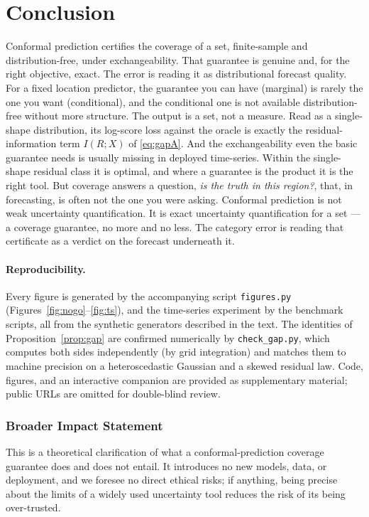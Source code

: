 \documentclass[10pt]{article} %
\theoremstyle{definition}
\begin{document}
\section{Conclusion}

Conformal prediction certifies the coverage of a set, finite-sample and
distribution-free, under exchangeability. That guarantee is genuine and, for the right
objective, exact. The error is reading it as distributional forecast quality. For a fixed
location predictor, the guarantee you can have (marginal) is rarely the one you want
(conditional), and the conditional one is not available distribution-free without more
structure. The output is a set, not a measure. Read as a single-shape distribution, its
log-score loss against the oracle is exactly the residual-information term
$I(R;X)$ of \eqref{eq:gapA}. And the exchangeability even the basic guarantee needs is
usually missing in deployed time-series. Within the single-shape residual class it is
optimal, and where a guarantee is the product it is the right tool. But coverage answers a question,
\emph{is the truth in this region?}, that, in forecasting, is often not the one you
were asking. Conformal prediction is not weak uncertainty quantification. It is exact
uncertainty quantification for a set --- a coverage guarantee, no more and no less. The
category error is reading that certificate as a verdict on the forecast underneath it.

\paragraph{Reproducibility.} Every figure is generated by the accompanying script
\texttt{figures.py} (Figures~\ref{fig:nogo}--\ref{fig:ts}), and the time-series experiment
by the benchmark scripts, all from the synthetic generators described in the text. The
identities of Proposition~\ref{prop:gap} are confirmed numerically by \texttt{check\_gap.py},
which computes both sides independently (by grid integration) and matches them to machine
precision on a heteroscedastic Gaussian and a skewed residual law. Code, figures, and an
interactive companion are provided as supplementary material; public URLs are omitted for
double-blind review.

\subsubsection*{Broader Impact Statement}
This is a theoretical clarification of what a conformal-prediction coverage guarantee does
and does not entail. It introduces no new models, data, or deployment, and we foresee no
direct ethical risks; if anything, being precise about the limits of a widely used
uncertainty tool reduces the risk of its being over-trusted.



\end{document}
